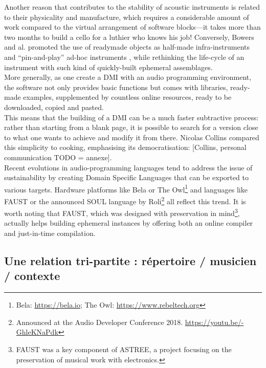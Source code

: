 Another reason that contributes to the stability of acoustic instruments is related to their physicality and manufacture, which requires a considerable amount of work compared to the virtual arrangement of software blocks—it takes more than two months to build a cello for a luthier who knows his job! Conversely, Bowers and al. promoted the use of readymade objects as half-made infra-instruments \cite{bowers_not_2005} and “pin-and-play” ad-hoc instruments \cite{bowers_creating_2006}, while rethinking the life-cycle of an instrument with such kind of quickly-built ephemeral assemblages.\\
\indent More generally, as one create a DMI with an audio programming environment, the software not only provides basic functions but comes with libraries, ready-made examples, supplemented by countless online resources, ready to be downloaded, copied and pasted.\\
\indent This means that the building of a DMI can be a much faster subtractive process: rather than starting from a blank page, it is possible to search for a version close to what one wants to achieve and modify it from there. Nicolas Collins compared this simplicity to cooking, emphasising its democratisation:  [Collins, personal communication TODO = annexe].\\
\indent Recent evolutions in audio-programming languages tend to address the issue of sustainability by creating Domain Specific Languages that can be exported to various targets. Hardware platforms like Bela or The Owl\footnote{Bela: \url{https://bela.io}; The Owl: \url{https://www.rebeltech.org}} and languages like FAUST \cite{orlarey_faust_2008} or the announced SOUL language by Roli\footnote{Announced at the Audio Developer Conference 2018. \url{https://youtu.be/-GhleKNaPdk}} all reflect this trend. It is worth noting that FAUST, which was designed with preservation in mind\footnote{FAUST was a key component of ASTREE, a project focusing on the preservation of musical work with electronics.}, actually helps building ephemeral instances by offering both an online compiler and just-in-time compilation.
	
\subsection{Une relation tri-partite : répertoire / musicien / contexte}

